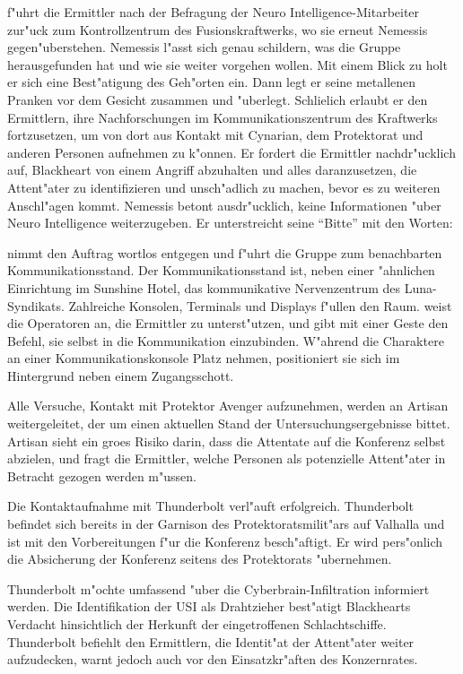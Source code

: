 \xl{} f"uhrt die Ermittler nach der Befragung der Neuro Intelligence-Mitarbeiter zur"uck zum Kontrollzentrum des Fusionskraftwerks, wo sie erneut Nemessis gegen"uberstehen. Nemessis l"asst sich genau schildern, was die Gruppe herausgefunden hat und wie sie weiter vorgehen wollen. Mit einem Blick zu \xl{} holt er sich eine Best"atigung des Geh"orten ein. Dann legt er seine metallenen Pranken vor dem Gesicht zusammen und "uberlegt. Schlie\3lich erlaubt er den Ermittlern, ihre Nachforschungen im Kommunikationszentrum des Kraftwerks fortzusetzen, um von dort aus Kontakt mit Cynarian, dem Protektorat und anderen Personen aufnehmen zu k"onnen. Er fordert die Ermittler nachdr"ucklich auf, Blackheart von einem Angriff abzuhalten und alles daranzusetzen, die Attent"ater zu identifizieren und unsch"adlich zu machen, bevor es zu weiteren Anschl"agen kommt. Nemessis betont ausdr"ucklich, keine Informationen "uber Neuro Intelligence weiterzugeben. Er unterstreicht seine ``Bitte'' mit den Worten:


\xl{} nimmt den Auftrag wortlos entgegen und f"uhrt die Gruppe zum benachbarten Kommunikationsstand. Der Kommunikationsstand ist, neben einer "ahnlichen Einrichtung im Sunshine Hotel, das kommunikative Nervenzentrum des Luna-Syndikats. Zahlreiche Konsolen, Terminals und Displays f"ullen den Raum. \xl{} weist die Operatoren an, die Ermittler zu unterst"utzen, und gibt mit einer Geste den Befehl, sie selbst in die Kommunikation einzubinden. W"ahrend die Charaktere an einer Kommunikationskonsole Platz nehmen, positioniert sie sich im Hintergrund neben einem Zugangsschott.

Alle Versuche, Kontakt mit Protektor Avenger aufzunehmen, werden an Artisan weitergeleitet, der um einen aktuellen Stand der Untersuchungsergebnisse bittet. Artisan sieht ein gro\3es Risiko darin, dass die Attentate auf die Konferenz selbst abzielen, und fragt die Ermittler, welche Personen als potenzielle Attent"ater in Betracht gezogen werden m"ussen.

Die Kontaktaufnahme mit Thunderbolt verl"auft erfolgreich. Thunderbolt befindet sich bereits in der Garnison des Protektoratsmilit"ars auf Valhalla und ist mit den Vorbereitungen f"ur die Konferenz besch"aftigt. Er wird pers"onlich die Absicherung der Konferenz seitens des Protektorats "ubernehmen. 

Thunderbolt m"ochte umfassend "uber die Cyberbrain-Infiltration informiert werden. Die Identifikation der USI als Drahtzieher best"atigt Blackhearts Verdacht hinsichtlich der Herkunft der eingetroffenen Schlachtschiffe. Thunderbolt befiehlt den Ermittlern, die Identit"at der Attent"ater weiter aufzudecken, warnt jedoch auch vor den Einsatzkr"aften des Konzernrates. 

